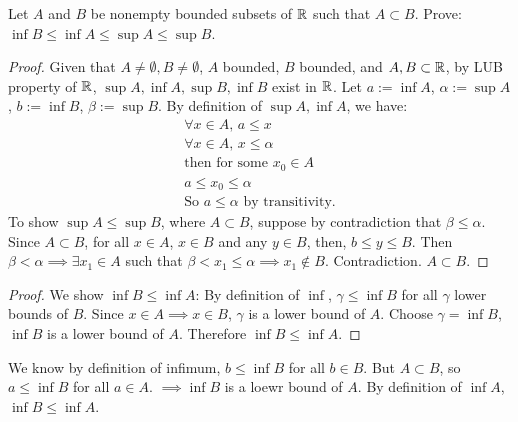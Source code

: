 \documentclass[]{article}
\begin{document}
\begin{example}
	[HW2.1] Let $A$ and $B$ be nonempty bounded subsets of $\mathbb{R}$ such that $A\subset B$. Prove: $\inf B \leq \inf A \leq \sup A \leq \sup B$.
	\begin{proof}
		Given that $A\neq \emptyset,B\neq\emptyset$, $A$ bounded, $B$ bounded, and $A,B\subset \mathbb{R}$, by LUB property of $\mathbb{R}$, $\sup A,\inf A, \sup B, \inf B$ exist in $\mathbb{R}$.
		Let $a:= \inf A$, $\alpha := \sup A$, $b:=\inf B$, $\beta:=\sup B$.
		By definition of $\sup A,\inf A$, we have:
		\begin{align*}
			\forall x\in A,\, a\leq x \\
			\forall x\in A,\, x\leq \alpha \\
			\text{then for some } x_0\in A \\
			a\leq x_0 \leq \alpha \\
			\text{So } a\leq \alpha \text{ by transitivity}.
		\end{align*}
		To show $\sup A\leq \sup B$, where $A\subset B$, suppose by contradiction that $\beta \leq \alpha$. Since $A\subset B$, for all $x\in A$, $x\in B$ and any $y\in B$, then, $b\leq y \leq B$.
		Then $\beta < \alpha \implies \exists x_1\in A$ such that $\beta<x_1\leq \alpha \implies x_1\notin B$. Contradiction. $A\subset B$.
	\end{proof}
	\begin{proof}
		We show $\inf B\leq \inf A$: By definition of $\inf$, $\gamma \leq \inf B$ for all $\gamma$ lower bounds of $B$.
		Since $x\in A \implies x\in B$, $\gamma$ is a lower bound of $A$. Choose $\gamma = \inf B$, $\inf B$ is a lower bound of $A$. Therefore $\inf B\leq \inf A$.
	\end{proof}
	We know by definition of infimum, $b\leq \inf B$ for all $b\in B$. But $A\subset B$, so $a\leq\inf B$ for all $a\in A$. $\implies \inf B$ is a loewr bound of $A$. By definition of $\inf A$, $\inf B\leq \inf A$.
\end{example}
\end{document}
